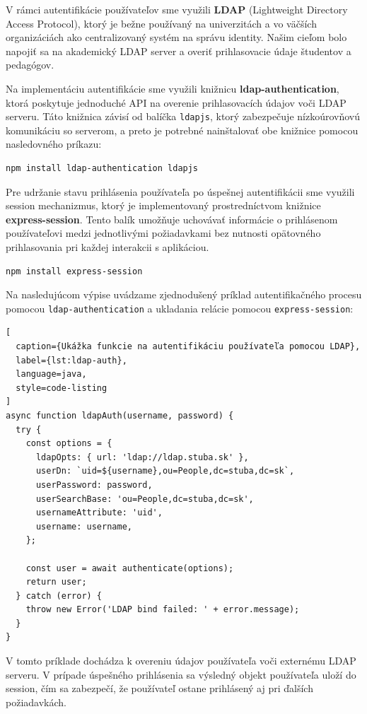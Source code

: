 V rámci autentifikácie používateľov sme využili \textbf{LDAP} (Lightweight Directory Access Protocol), ktorý je bežne používaný na univerzitách a vo väčších organizáciách ako centralizovaný systém na správu identity. Našim cieľom bolo napojiť sa na akademický LDAP server a overiť prihlasovacie údaje študentov a pedagógov.

Na implementáciu autentifikácie sme využili knižnicu \textbf{ldap-authentication}, ktorá poskytuje jednoduché API na overenie prihlasovacích údajov voči LDAP serveru. 
Táto knižnica závisí od balíčka \texttt{ldapjs}, ktorý zabezpečuje nízkoúrovňovú komunikáciu so serverom, a preto je potrebné nainštalovať obe knižnice pomocou nasledovného príkazu:

\begin{verbatim}
npm install ldap-authentication ldapjs
\end{verbatim}

Pre udržanie stavu prihlásenia používateľa po úspešnej autentifikácii sme využili session mechanizmus, ktorý je implementovaný prostredníctvom knižnice \textbf{express-session}. 
Tento balík umožňuje uchovávať informácie o prihlásenom používateľovi medzi jednotlivými požiadavkami bez nutnosti opätovného prihlasovania pri každej interakcii s aplikáciou.

\begin{verbatim}
npm install express-session
\end{verbatim}

\bigskip
Na nasledujúcom výpise uvádzame zjednodušený príklad autentifikačného procesu pomocou \texttt{ldap-authentication} a ukladania relácie pomocou \texttt{express-session}:

\begin{lstlisting}[
  caption={Ukážka funkcie na autentifikáciu používateľa pomocou LDAP},
  label={lst:ldap-auth},
  language=java,
  style=code-listing
]
async function ldapAuth(username, password) {
  try {
    const options = {
      ldapOpts: { url: 'ldap://ldap.stuba.sk' },
      userDn: `uid=${username},ou=People,dc=stuba,dc=sk`,
      userPassword: password,
      userSearchBase: 'ou=People,dc=stuba,dc=sk',
      usernameAttribute: 'uid',
      username: username,
    };

    const user = await authenticate(options);
    return user;
  } catch (error) {
    throw new Error('LDAP bind failed: ' + error.message);
  }
}
\end{lstlisting}


\bigskip
V tomto príklade dochádza k overeniu údajov používateľa voči externému LDAP serveru. V prípade úspešného prihlásenia sa výsledný objekt používateľa uloží do session, čím sa zabezpečí, že používateľ ostane prihlásený aj pri ďalších požiadavkách.

